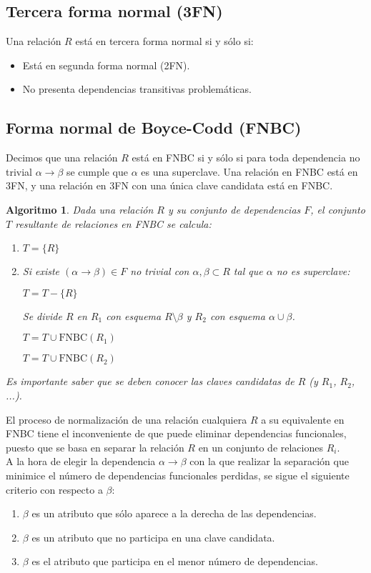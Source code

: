 \documentclass[12pt,a4paper]{article}
\theoremstyle{ejemplo}
\theoremstyle{algoritmo}
\newtheorem*{alg}{Algoritmo} %
\begin{document}
\subsection*{Tercera forma normal (3FN)}
Una relación $R$ está en tercera forma normal si y sólo si:
\begin{itemize}[noitemsep]
	\item Está en segunda forma normal (2FN).
	\item No presenta dependencias transitivas problemáticas.
\end{itemize}

\subsection*{Forma normal de Boyce-Codd (FNBC)}
Decimos que una relación $R$ está en FNBC si y sólo si para toda dependencia no
trivial $\alpha\to\beta$ se cumple que $\alpha$ es una superclave. Una relación
en FNBC está en 3FN, y una relación en 3FN con una única clave candidata está en
FNBC.

\begin{alg}
Dada una relación $R$ y su conjunto de dependencias $F$, el conjunto $T$ 
resultante de relaciones en FNBC se calcula:
\begin{enumerate}[noitemsep]
	\item $T=\{R\}$
	\item Si existe $(\alpha\to\beta)\in F$ no trivial con $\alpha,\beta\subset 
	R$ tal que $\alpha$ no es superclave:

	\quad\quad $T=T-\{R\}$
	
	\quad\quad Se divide $R$ en $R_1$ con esquema $R\setminus\beta$ y $R_2$ con
	esquema $\alpha\cup\beta$.
	
	\quad\quad $T=T\cup\text{FNBC}(R_1)$
	
	\quad\quad $T=T\cup\text{FNBC}(R_2)$
	
\end{enumerate}
Es importante saber que se deben conocer las claves candidatas de $R$ (y $R_1$, 
$R_2$, ...).
\end{alg}

El proceso de normalización de una relación cualquiera $R$ a su equivalente en
FNBC tiene el inconveniente de que puede eliminar dependencias funcionales, 
puesto que se basa en separar la relación $R$ en un conjunto de relaciones $R_i$.
\\

A la hora de elegir la dependencia $\alpha\to\beta$ con la que realizar la 
separación que minimice el número de dependencias funcionales perdidas, se sigue 
el siguiente criterio con respecto a $\beta$:
\begin{enumerate}[noitemsep]
	\item $\beta$ es un atributo que sólo aparece a la derecha de las 
	dependencias.
	\item $\beta$ es un atributo que no participa en una clave candidata.
	\item $\beta$ es el atributo que participa en el menor número de dependencias.
\end{enumerate}
\end{document}

